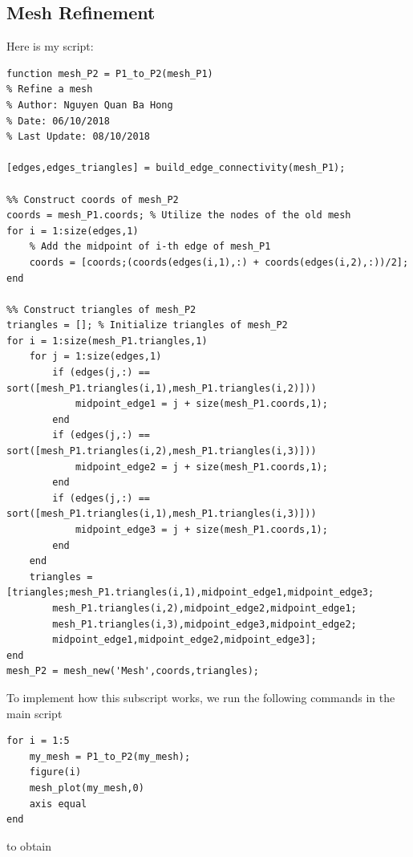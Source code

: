 \documentclass[11pt,a4paper,center,notitlepage]{article}
\numberwithin{equation}{section}
\begin{document}
\subsection{Mesh Refinement}
Here is my script:
\begin{verbatim}
function mesh_P2 = P1_to_P2(mesh_P1)
% Refine a mesh
% Author: Nguyen Quan Ba Hong
% Date: 06/10/2018
% Last Update: 08/10/2018

[edges,edges_triangles] = build_edge_connectivity(mesh_P1);

%% Construct coords of mesh_P2
coords = mesh_P1.coords; % Utilize the nodes of the old mesh
for i = 1:size(edges,1)
    % Add the midpoint of i-th edge of mesh_P1
    coords = [coords;(coords(edges(i,1),:) + coords(edges(i,2),:))/2];
end

%% Construct triangles of mesh_P2
triangles = []; % Initialize triangles of mesh_P2
for i = 1:size(mesh_P1.triangles,1)
    for j = 1:size(edges,1)
        if (edges(j,:) == sort([mesh_P1.triangles(i,1),mesh_P1.triangles(i,2)]))
            midpoint_edge1 = j + size(mesh_P1.coords,1);
        end
        if (edges(j,:) == sort([mesh_P1.triangles(i,2),mesh_P1.triangles(i,3)]))
            midpoint_edge2 = j + size(mesh_P1.coords,1);
        end
        if (edges(j,:) == sort([mesh_P1.triangles(i,1),mesh_P1.triangles(i,3)]))
            midpoint_edge3 = j + size(mesh_P1.coords,1);
        end
    end
    triangles = [triangles;mesh_P1.triangles(i,1),midpoint_edge1,midpoint_edge3;
        mesh_P1.triangles(i,2),midpoint_edge2,midpoint_edge1;
        mesh_P1.triangles(i,3),midpoint_edge3,midpoint_edge2;
        midpoint_edge1,midpoint_edge2,midpoint_edge3];
end
mesh_P2 = mesh_new('Mesh',coords,triangles);
\end{verbatim}
To implement how this subscript works, we run the following commands in the main script
\begin{verbatim}
for i = 1:5
    my_mesh = P1_to_P2(my_mesh);
    figure(i)
    mesh_plot(my_mesh,0)
    axis equal
end
\end{verbatim}
to obtain
\end{document}
